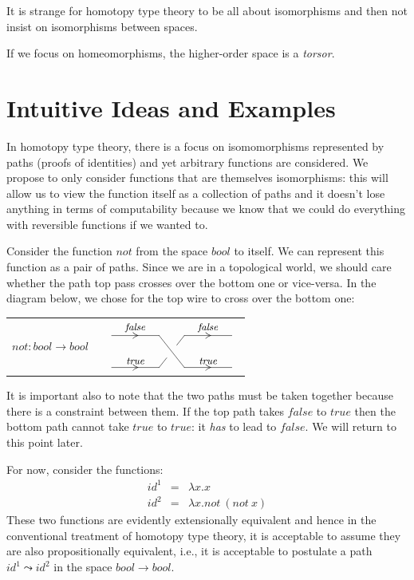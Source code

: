 \documentclass[11pt]{article}
\makeatletter
\def\wirechart#1#2{\let\labelstyle\objectstyle\xy*[*1.0]\xybox{\small%
\xymatrix@C=10mm@R=4mm#1{#2}}\endxy}
\def\wire#1#2{\ar@{-}[#1]^<>(.5){#2}}
\def\wireright#1#2{\wire{#1}{#2}\ar@{}[#1]|<>(.5)/.6ex/{\dir2{>}}}
\def\wwblank#1{*=<#1,0mm>{~}}
\def\blank{\wwblank{8mm}}
\def\wirecross#1{\save[]!L;[#1]!R**@{-}\restore}
\def\wirebraid#1#2{\save[]!L;[#1]!R**{}?(#2)**@{-}\restore\save[#1]!R;[]!L**{}?(#2)**@{-}\restore}
\newcommand{\boolt}{\mathit{bool}}
\newcommand{\ffv}{\mathit{false}}
\newcommand{\ttv}{\mathit{true}}
\newcommand{\notb}{\mathit{not}}
\renewcommand{\path}{\leadsto}
\makeatother
\begin{document}
It is strange for homotopy type theory to be all about isomorphisms and then
not insist on isomorphisms between spaces.

If we focus on homeomorphisms, the higher-order space is a \emph{torsor}.

\section{Intuitive Ideas and Examples} 
\label{sec:intuition}


In homotopy type theory, there is a focus on isomomorphisms represented by
paths (proofs of identities) and yet arbitrary functions are considered. We
propose to only consider functions that are themselves isomorphisms: this
will allow us to view the function itself as a collection of paths and it
doesn't lose anything in terms of computability because we know that we could
do everything with reversible functions if we wanted to.

Consider the function $\notb$ from the space $\boolt$ to itself. We can
represent this function as a pair of paths. Since we are in a topological
world, we should care whether the path top pass crosses over the bottom one
or vice-versa. In the diagram below, we chose for the top wire to cross over
the bottom one:

\begin{center}
  \begin{tabular}{@{}llc@{}}
    $\notb : \boolt \rightarrow \boolt$ & & 
    $\vcenter{\wirechart{@C=1.5cm@R=0.8cm}{
        *{}\wireright{r}{\ffv}&\blank\wirecross{d}\wireright{r}{\ffv}&\\
        *{}\wireright{r}{\ttv}&\blank\wirebraid{u}{.3}\wireright{r}{\ttv}&
        }}$ 
  \end{tabular}
\end{center}

It is important also to note that the two paths must be taken together
because there is a constraint between them. If the top path takes $\ffv$ to
$\ttv$ then the bottom path cannot take $\ttv$ to $\ttv$: it \emph{has} to
lead to $\ffv$. We will return to this point later.

For now, consider the functions:
\[\begin{array}{rcl}
\mathit{id}^1 &=& \lambda x.x \\
\mathit{id}^2 &=& \lambda x. \notb~(\notb~x)
\end{array}\]
These two functions are evidently extensionally equivalent and hence in the
conventional treatment of homotopy type theory, it is acceptable to assume
they are also propositionally equivalent, i.e., it is acceptable to postulate
a path $\mathit{id}^1 \path \mathit{id}^2$ in the space $\boolt \rightarrow
\boolt$. 
\end{document}
